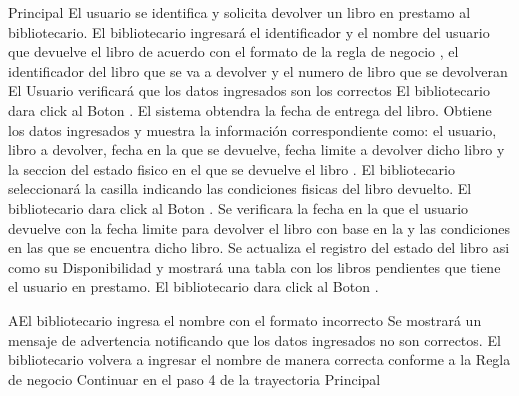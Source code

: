 	\begin{UCtrayectoria}{Principal}
		\UCpaso[\UCactor] El usuario se identifica y solicita devolver un libro en prestamo al bibliotecario.  
		\UCpaso[\UCactor] El bibliotecario ingresará el identificador y el nombre del usuario que devuelve el libro de acuerdo con el formato de la regla de negocio , el identificador del libro que se va a devolver y el numero de libro que se devolveran 
		\UCpaso[\UCactor] El Usuario verificará que los datos ingresados son los correctos
		\UCpaso[\UCactor] El bibliotecario dara click al Boton .
		\UCpaso[\UCsist] El sistema obtendra la fecha de entrega del libro.
				\UCpaso[\UCsist] Obtiene los datos ingresados y muestra la información correspondiente como: el usuario, libro a devolver, fecha en la que se devuelve, fecha limite a devolver dicho libro y la seccion del estado fisico en el que se devuelve el libro .
\UCpaso[\UCactor] El bibliotecario seleccionará la casilla indicando las condiciones fisicas del libro devuelto.						
						\UCpaso[\UCactor] El bibliotecario dara click al Boton  .
		\UCpaso[\UCsist] Se verificara la fecha en la que el usuario devuelve con la fecha limite para devolver el libro con base en la  y las condiciones en las que se encuentra dicho libro. 
				\UCpaso[\UCsist] Se actualiza el registro del estado del libro asi como su Disponibilidad y mostrará una tabla con los libros pendientes que tiene el usuario en prestamo.   
	\UCpaso[\UCactor] El bibliotecario dara click al Boton .
	\end{UCtrayectoria}
				\begin{UCtrayectoriaA}{A}{El bibliotecario ingresa el nombre con el formato incorrecto}
			\UCpaso[\UCsist] Se mostrará un mensaje de advertencia notificando que los datos ingresados no son correctos. 
			\UCpaso[\UCactor] El bibliotecario volvera a ingresar el nombre de manera correcta conforme a la Regla de negocio  
			\UCpaso[\UCsist]Continuar en el paso 4 de la trayectoria Principal
		\end{UCtrayectoriaA}


